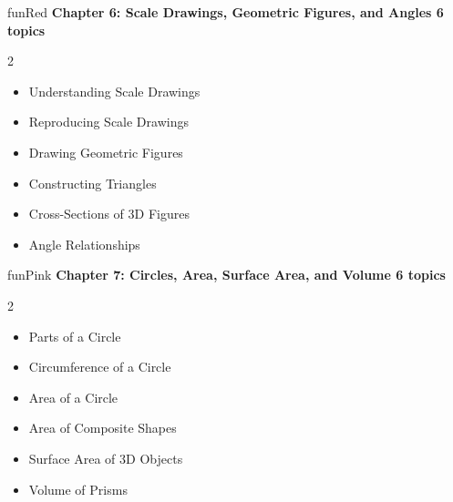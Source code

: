 {
\sffamily

\vspace*{3mm}

\begin{wbChapterStripe}{funRed}
{\small\bfseries\color{black!80}Chapter 6: Scale Drawings, Geometric Figures, and Angles%
\hfill\normalfont\color{black!50}6 topics}

\vspace{1mm}
\small
\begin{multicols}{2}
\begin{itemize}[leftmargin=4mm, itemsep=1pt, topsep=1pt]
    \item Understanding Scale Drawings
    \item Reproducing Scale Drawings
    \item Drawing Geometric Figures
    \item Constructing Triangles
    \item Cross-Sections of 3D Figures
    \item Angle Relationships
\end{itemize}
\end{multicols}
\end{wbChapterStripe}

\vspace{2mm}

\begin{wbChapterStripe}{funPink}
{\small\bfseries\color{black!80}Chapter 7: Circles, Area, Surface Area, and Volume%
\hfill\normalfont\color{black!50}6 topics}

\vspace{1mm}
\small
\begin{multicols}{2}
\begin{itemize}[leftmargin=4mm, itemsep=1pt, topsep=1pt]
    \item Parts of a Circle
    \item Circumference of a Circle
    \item Area of a Circle
    \item Area of Composite Shapes
    \item Surface Area of 3D Objects
    \item Volume of Prisms
\end{itemize}
\end{multicols}
\end{wbChapterStripe}

}
